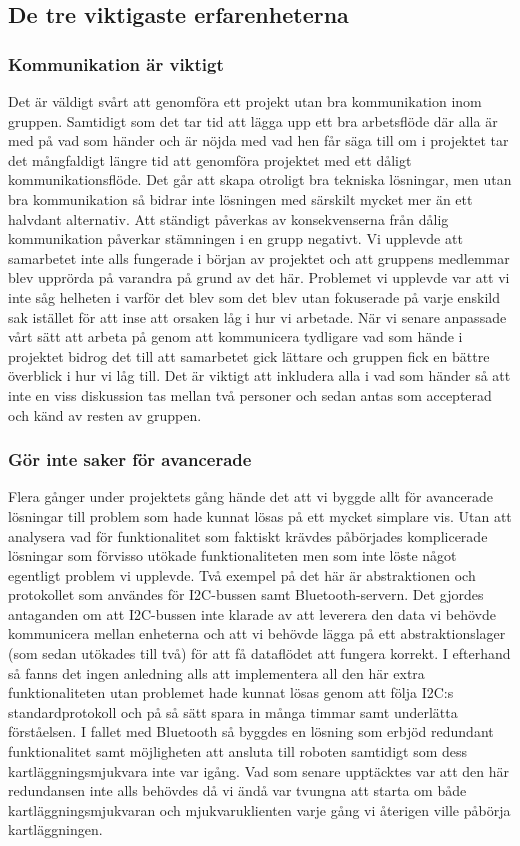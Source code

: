 \documentclass{article}
\begin{document}
\subsection{De tre viktigaste erfarenheterna}
\subsubsection{Kommunikation är viktigt}
Det är väldigt svårt att genomföra ett projekt utan bra kommunikation inom gruppen. Samtidigt som det tar tid att lägga upp ett bra arbetsflöde där alla är med på vad som händer och är nöjda med vad hen får säga till om i projektet tar det mångfaldigt längre tid att genomföra projektet med ett dåligt kommunikationsflöde. Det går att skapa otroligt bra tekniska lösningar, men utan bra kommunikation så bidrar inte lösningen med särskilt mycket mer än ett halvdant alternativ.
\newline\newline
Att ständigt påverkas av konsekvenserna från dålig kommunikation påverkar stämningen i en grupp negativt. Vi upplevde att samarbetet inte alls fungerade i början av projektet och att gruppens medlemmar blev upprörda på varandra på grund av det här. Problemet vi upplevde var att vi inte såg helheten i varför det blev som det blev utan fokuserade på varje enskild sak istället för att inse att orsaken låg i hur vi arbetade. När vi senare anpassade vårt sätt att arbeta på genom att kommunicera tydligare vad som hände i projektet bidrog det till att samarbetet gick lättare och gruppen fick en bättre överblick i hur vi låg till. Det är viktigt att inkludera alla i vad som händer så att inte en viss diskussion tas mellan två personer och sedan antas som accepterad och känd av resten av gruppen.

\subsubsection{Gör inte saker för avancerade}
Flera gånger under projektets gång hände det att vi byggde allt för avancerade lösningar till problem som hade kunnat lösas på ett mycket simplare vis. Utan att analysera vad för funktionalitet som faktiskt krävdes påbörjades komplicerade lösningar som förvisso utökade funktionaliteten men som inte löste något egentligt problem vi upplevde. Två exempel på det här är abstraktionen och protokollet som användes för I2C-bussen samt Bluetooth-servern. Det gjordes antaganden om att I2C-bussen inte klarade av att leverera den data vi behövde kommunicera mellan enheterna och att vi behövde lägga på ett abstraktionslager (som sedan utökades till två) för att få dataflödet att fungera korrekt. I efterhand så fanns det ingen anledning alls att implementera all den här extra funktionaliteten utan problemet hade kunnat lösas genom att följa I2C:s standardprotokoll och på så sätt spara in många timmar samt underlätta förståelsen. I fallet med Bluetooth så byggdes en lösning som erbjöd redundant funktionalitet samt möjligheten att ansluta till roboten samtidigt som dess kartläggningsmjukvara inte var igång. Vad som senare upptäcktes var att den här redundansen inte alls behövdes då vi ändå var tvungna att starta om både kartläggningsmjukvaran och mjukvaruklienten varje gång vi återigen ville påbörja kartläggningen.
\end{document}

